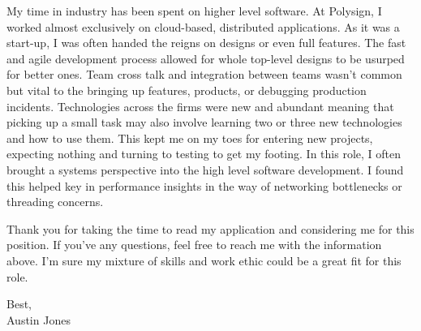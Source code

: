 \documentclass[a4paper,12pt]{article}
\begin{document}
My time in industry has been spent on higher level software.
At Polysign, I worked almost exclusively on cloud-based, distributed applications.
As it was a start-up, I was often handed the reigns on designs or even full features.
The fast and agile development process allowed for whole top-level designs to be usurped for better ones.
Team cross talk and integration between teams wasn't common but vital to the bringing up features, products, or debugging production incidents.
Technologies across the firms were new and abundant meaning that picking up a small task may also involve learning two or three new technologies and how to use them.
This kept me on my toes for entering new projects, expecting nothing and turning to testing to get my footing.
In this role, I often brought a systems perspective into the high level software development.
I found this helped key in performance insights in the way of networking bottlenecks or threading concerns.

Thank you for taking the time to read my application and considering me for this position.
If you've any questions, feel free to reach me with the information above.
I'm sure my mixture of skills and work ethic could be a great fit for this role.

Best, \\
Austin Jones
\end{document}
